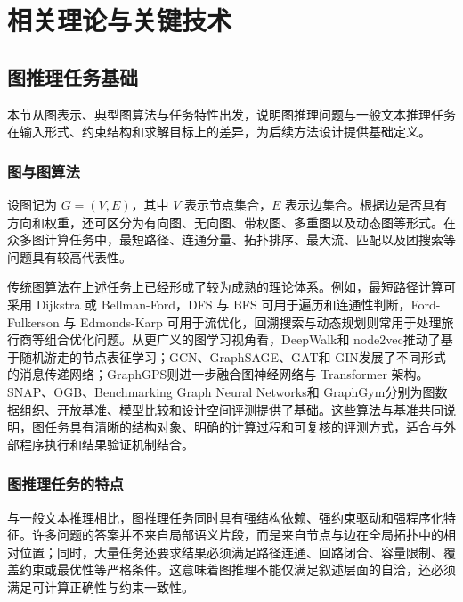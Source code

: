 \chapter{相关理论与关键技术}
\label{chp:related_tech}

\section{图推理任务基础}

本节从图表示、典型图算法与任务特性出发，说明图推理问题与一般文本推理任务在输入形式、约束结构和求解目标上的差异，为后续方法设计提供基础定义。

\subsection{图与图算法}

设图记为 $G=(V,E)$，其中 $V$ 表示节点集合，$E$ 表示边集合。根据边是否具有方向和权重，还可区分为有向图、无向图、带权图、多重图以及动态图等形式\cite{diestel2017graph}。在众多图计算任务中，最短路径、连通分量、拓扑排序、最大流、匹配以及团搜索等问题具有较高代表性。

传统图算法在上述任务上已经形成了较为成熟的理论体系。例如，最短路径计算可采用 Dijkstra 或 Bellman-Ford，DFS 与 BFS 可用于遍历和连通性判断，Ford-Fulkerson 与 Edmonds-Karp 可用于流优化\cite{cormen2009clrs}，回溯搜索与动态规划则常用于处理旅行商等组合优化问题\cite{korte2018combinatorial}。从更广义的图学习视角看，DeepWalk\cite{perozzi2014deepwalk}和 node2vec\cite{grover2016node2vec}推动了基于随机游走的节点表征学习；GCN\cite{kipf2017gcn}、GraphSAGE\cite{hamilton2017graphsage}、GAT\cite{velickovic2018gat}和 GIN\cite{xu2019gin}发展了不同形式的消息传递网络；GraphGPS\cite{rampasek2022graphgps}则进一步融合图神经网络与 Transformer 架构。SNAP\cite{leskovec2016snap}、OGB\cite{hu2020ogb}、Benchmarking Graph Neural Networks\cite{dwivedi2023benchmarking}和 GraphGym\cite{you2020graphgym}分别为图数据组织、开放基准、模型比较和设计空间评测提供了基础。这些算法与基准共同说明，图任务具有清晰的结构对象、明确的计算过程和可复核的评测方式，适合与外部程序执行和结果验证机制结合。

\subsection{图推理任务的特点}

与一般文本推理相比，图推理任务同时具有强结构依赖、强约束驱动和强程序化特征。许多问题的答案并不来自局部语义片段，而是来自节点与边在全局拓扑中的相对位置；同时，大量任务还要求结果必须满足路径连通、回路闭合、容量限制、覆盖约束或最优性等严格条件。这意味着图推理不能仅满足叙述层面的自洽，还必须满足可计算正确性与约束一致性。

